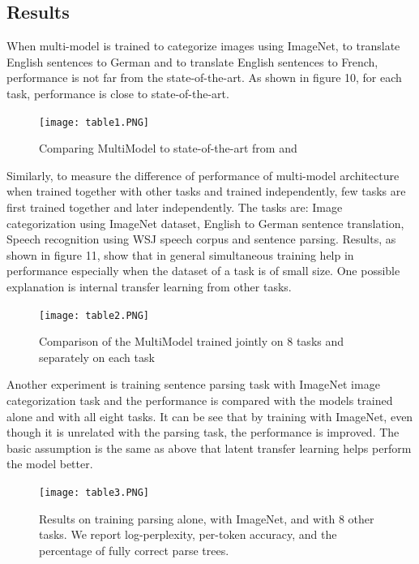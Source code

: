 \documentclass[12pt]{article}
\begin{document}
\subsection{Results}
When multi-model is trained to categorize images using ImageNet, to translate English sentences to German and to translate English sentences to French, performance is not far from the state-of-the-art. As shown in figure 10, for each task, performance is close to state-of-the-art. 
\begin{center}
\begin{figure}[h]
  \centering
  \begin{minipage}[b]{1.0\textwidth}
    \centering
    \texttt{[image: table1.PNG]}
      \centering
    \caption{Comparing MultiModel to state-of-the-art from \cite{SzegedyIV16} and \cite{ShazeerMMDLHD17}}
  \end{minipage}
\end{figure}
\end{center}
Similarly, to measure the difference of performance of multi-model architecture when trained together with other tasks and trained independently, few tasks are first trained together and later independently. The tasks are: Image categorization using ImageNet dataset, English to German sentence translation, Speech recognition using WSJ speech corpus and sentence parsing. Results, as shown in figure 11, show that in general simultaneous training help in performance especially when the dataset of a task is of small size. One possible explanation is internal transfer learning from other tasks.
\begin{center}
\begin{figure}[h]
  \centering
  \begin{minipage}[b]{1.0\textwidth}
    \centering
    \texttt{[image: table2.PNG]}
      \centering
    \caption{Comparison of the MultiModel trained jointly on 8 tasks and separately on each task}
  \end{minipage}
\end{figure}
\end{center}
Another experiment is training sentence parsing task with ImageNet image categorization task and the performance is compared with the models trained alone and with all eight tasks. It can be see that by training with ImageNet, even though it is unrelated with the parsing task, the performance is improved. The basic assumption is the same as above that latent transfer learning helps perform the model better.
\begin{center}
\begin{figure}[h]
  \centering
  \begin{minipage}[b]{1.0\textwidth}
    \centering
    \texttt{[image: table3.PNG]}
      \centering
    \caption{Results on training parsing alone, with ImageNet, and with 8 other tasks. We report
log-perplexity, per-token accuracy, and the percentage of fully correct parse trees.}
  \end{minipage}
\end{figure}
\end{center}
\end{document}

